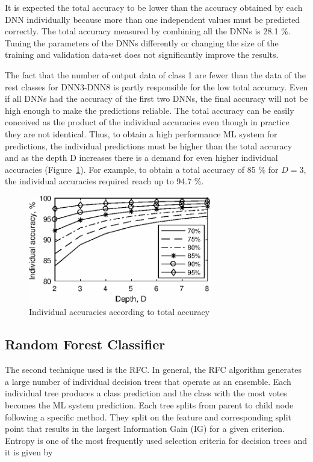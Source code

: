 \documentclass[aerospace,article,submit,moreauthors,dvi2pdf]{Definitions/mdpi}
\begin{document}
It is expected the total accuracy to be lower than the accuracy obtained by each DNN individually because more than one independent values must be predicted correctly. The total accuracy measured by combining all the DNNs is 28.1 \%. Tuning the parameters of the DNNs differently or changing the size of the training and validation data-set does not significantly improve the results. 

The fact that the number of output data of class 1 are fewer than the data of the rest classes for DNN3-DNN8 is partly responsible for the low total accuracy. Even if all DNNs had the accuracy of the first two DNNs, the final accuracy will not be high enough to make the predictions reliable. The total accuracy can be easily conceived as the product of the individual accuracies even though in practice they are not identical.  Thus, to obtain a high performance ML system for predictions, the individual predictions must be higher than the total accuracy and as the depth D increases there is a demand for even higher individual accuracies (Figure~\ref{fig:individual_accuracies}). For example, to obtain a total accuracy of 85 \%  for $D=3$, the individual accuracies required reach up to 94.7 \%.
\begin{figure}[H]
\includegraphics[width=8cm]{chara5.eps}
\caption{\label{fig:individual_accuracies}Individual accuracies according to total accuracy}
\end{figure}

\subsection{Random Forest Classifier}
The second technique used is the RFC. In general, the RFC algorithm generates a large number of individual decision trees that operate as an ensemble. Each individual tree produces a class prediction and the class with the most votes becomes the ML system prediction. Each tree splits from parent to child node following a specific method. They split on the feature and corresponding split point that results in the largest Information Gain (IG) for a given criterion.
Entropy is one of the most frequently used selection criteria for decision trees and it is given by
\end{document}
